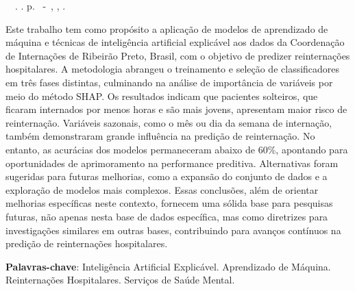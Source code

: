 \setlength{\absparsep}{18pt} %
\begin{resumo}
	\begin{flushleft} 
			\setlength{\absparsep}{0pt} %
			\SingleSpacing 
			\imprimirautorabr~~\textbf{\imprimirtituloresumo}.	\imprimirdata. \pageref{LastPage}p. 
			\imprimirtipotrabalho~-~\imprimirinstituicao, \imprimirlocal, \imprimirdata. 
 	\end{flushleft}
	\OnehalfSpacing 			
	Este trabalho tem como propósito a aplicação de modelos de aprendizado de máquina e técnicas de inteligência artificial explicável aos dados da Coordenação de Internações de Ribeirão Preto, Brasil, com o objetivo de predizer reinternações hospitalares. A metodologia abrangeu o treinamento e seleção de classificadores em três fases distintas, culminando na análise de importância de variáveis por meio do método SHAP. Os resultados indicam que pacientes solteiros, que ficaram internados por menos horas e são mais jovens, apresentam maior risco de reinternação. Variáveis sazonais, como o mês ou dia da semana de internação, também demonstraram grande influência na predição de reinternação. No entanto, as acurácias dos modelos permaneceram abaixo de 60\%, apontando para oportunidades de aprimoramento na performance preditiva. Alternativas foram sugeridas para futuras melhorias, como a expansão do conjunto de dados e a exploração de modelos mais complexos. Essas conclusões, além de orientar melhorias específicas neste contexto, fornecem uma sólida base para pesquisas futuras, não apenas nesta base de dados específica, mas como diretrizes para investigações similares em outras bases, contribuindo para avanços contínuos na predição de reinternações hospitalares.
	
	\vspace{\onelineskip}
	\noindent
	\textbf{Palavras-chave}: Inteligência Artificial Explicável. Aprendizado de Máquina. Reinternações Hospitalares. Serviços de Saúde Mental.
\end{resumo}